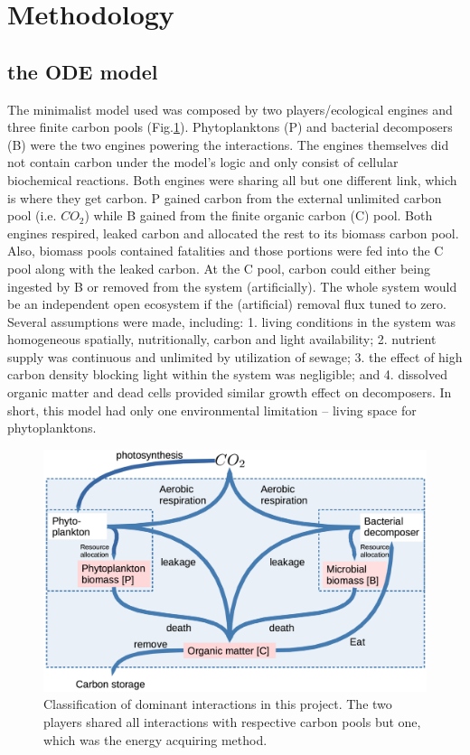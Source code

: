 \documentclass[../thesis.tex]{subfiles} %
\begin{document}
\section{Methodology}

\subsection{the ODE model}
The minimalist model used was composed by two players/ecological engines and three finite carbon pools (Fig.\ref{modelInWord}).  Phytoplanktons (P) and bacterial decomposers (B) were the two engines powering the interactions.  The engines themselves did not contain carbon under the model's logic and only consist of cellular biochemical reactions.  Both engines were sharing all but one different link, which is where they get carbon.  P gained carbon from the external unlimited carbon pool (i.e. $CO_2$) while B gained from the finite organic carbon (C) pool.  Both engines respired, leaked carbon and allocated the rest to its biomass carbon pool.  Also, biomass pools contained fatalities and those portions were fed into the C pool along with the leaked carbon.  At the C pool, carbon could either being ingested by B or removed from the system (artificially).  The whole system would be an independent open ecosystem if the (artificial) removal flux tuned to zero.  Several assumptions were made, including: 1. living conditions in the system was homogeneous spatially, nutritionally, carbon and light availability; 2. nutrient supply was continuous and unlimited by utilization of sewage;\autocite{markou2014microalgal} 3. the effect of high carbon density blocking light within the system was negligible; and 4. dissolved organic matter and dead cells provided similar growth effect on decomposers.  In short, this model had only one environmental limitation -- living space for phytoplanktons.

\begin{figure}[H]
    \centering
    \includegraphics[width=.8\linewidth]{code/thesisSec/model.png}
    \caption[Model visualization]{Classification of dominant interactions in this project.  The two players shared all interactions with respective carbon pools but one, which was the energy acquiring method.}
    \label{modelInWord}
\end{figure}
\end{document}

